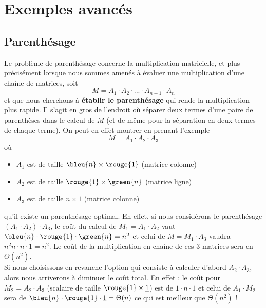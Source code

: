 \documentclass[12pt,a4paper]{book}
\begin{document}
\section{Exemples avancés}
\subsection{Parenthésage}
Le problème de parenthésage concerne la multiplication matricielle, et plus précisément lorsque nous sommes amenés à évaluer une multiplication d'une chaîne de matrices, soit 
$$M = A_1 \cdot A_2 \cdot ... \cdot A_{n-1} \cdot A_n$$
et que nous cherchons à \textbf{établir le parenthésage} qui rende la multiplication plus rapide. Il s'agit en gros de l'endroit où séparer deux termes d'une paire de parenthèses dans le calcul de $M$ (et de même pour la séparation en deux termes de chaque terme). On peut en effet montrer en prenant l'exemple $$M = A_1 \cdot A_2 \cdot A_3$$ où
\begin{itemize}
\item $A_1$ est de taille $\bleu{n}\times \rouge{1}$ (matrice colonne)
\item $A_2$ est de taille $\rouge{1}\times \green{n}$ (matrice ligne)
\item $A_3$ est de taille $n\times 1$ (matrice colonne)
\end{itemize}
qu'il existe un parenthésage optimal. En effet, si nous considérons le parenthésage $(A_1 \cdot A_2) \cdot A_3$, le coût du calcul de $M_1 = A_1\cdot A_2$ vaut $\bleu{n} \cdot \rouge{1} \cdot \green{n} = n^2$ et celui de $M = M_1 \cdot A_3$ vaudra $n^2 n \cdot n \cdot 1 = n^2$. Le coût de la multiplication en chaîne de ces 3 matrices sera en $\Theta(n^2)$. \\

Si nous choisissons en revanche l'option qui consiste à calculer d'abord $A_2\cdot A_3$, alors nous arriverons à diminuer le coût total. En effet : le coût pour $M_2 = A_2\cdot A_3$ (scalaire de taille $\rouge{1}\times \underline{1}$) est de $1\cdot n \cdot 1$ et celui de $A_1 \cdot M_2$ sera de $\bleu{n} \cdot \rouge{1} \cdot \underline{1} = \Theta(n)$ ce qui est meilleur que $\Theta(n^2)$ !
\end{document}
